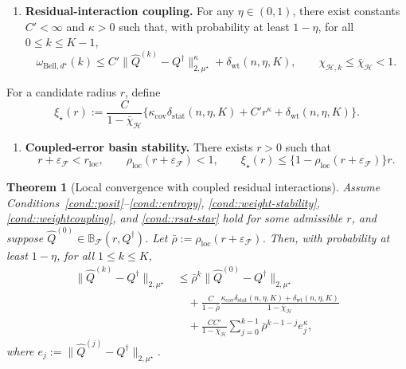 \documentclass{article}
\theoremstyle{plain}
\newtheorem{theorem}{Theorem}
\theoremstyle{definition}
\theoremstyle{remark}
\begin{document}
\begin{enumerate}[label=\textbf{C\arabic*)}, ref={C\arabic*}, leftmargin=1.5em, resume=cond]
\item \label{cond::weightcoupling}
\textbf{Residual-interaction coupling.}
For any \(\eta\in(0,1)\), there exist constants \(C'<\infty\) and
\(\kappa>0\) such that, with probability at least \(1-\eta\), for all
\(0\le k\le K-1\),
\[
\omega_{\mathrm{Bell},d^\star}(k)
\le
C'\|\widehat Q^{(k)}-Q^\dagger\|_{2,\mu^\star}^{\kappa}
+\delta_{\mathrm{wt}}(n,\eta,K),
\qquad
\chi_{\mathcal H,k}\le\bar\chi_{\mathcal H}<1.
\]
\end{enumerate}

For a candidate radius \(r\), define
\[
\xi_\star(r)
:=
\frac{C}{1-\bar\chi_{\mathcal H}}
\{\kappa_{\mathrm{cov}}\delta_{\mathrm{stat}}(n,\eta,K)
+C'r^\kappa+\delta_{\mathrm{wt}}(n,\eta,K)\}.
\]

\begin{enumerate}[label=\textbf{C\arabic*)}, ref={C\arabic*}, leftmargin=1.5em, resume=cond]
\item \label{cond::rsat-star}
\textbf{Coupled-error basin stability.}
There exists \(r>0\) such that
\[
r+\varepsilon_{\mathcal F}<r_{\mathrm{loc}},
\qquad
\rho_{\mathrm{loc}}(r+\varepsilon_{\mathcal F})<1,
\qquad
\xi_\star(r)
\le
\{1-\rho_{\mathrm{loc}}(r+\varepsilon_{\mathcal F})\}r.
\]
\end{enumerate}

\begin{theorem}[Local convergence with coupled residual interactions]
\label{thm:local-convergence2}
Assume Conditions~\ref{cond::posit}--\ref{cond::entropy},
\ref{cond::weight-stability}, \ref{cond::weightcoupling}, and
\ref{cond::rsat-star} hold for some admissible \(r\), and suppose
\(\widehat Q^{(0)}\in\mathbb B_{\mathcal F}(r,Q^\dagger)\). Let
\(\bar\rho:=\rho_{\mathrm{loc}}(r+\varepsilon_{\mathcal F})\). Then, with
probability at least \(1-\eta\), for all \(1\le k\le K\),
\begin{align*}
\|\widehat Q^{(k)}-Q^\dagger\|_{2,\mu^\star}
&\le
\bar\rho^k\|\widehat Q^{(0)}-Q^\dagger\|_{2,\mu^\star}
\\
&\quad+
\frac{C}{1-\bar\rho}
\frac{\kappa_{\mathrm{cov}}\delta_{\mathrm{stat}}(n,\eta,K)
+\delta_{\mathrm{wt}}(n,\eta,K)}{1-\bar\chi_{\mathcal H}}
\\
&\quad+
\frac{C C'}{1-\bar\chi_{\mathcal H}}
\sum_{j=0}^{k-1}\bar\rho^{k-1-j}e_j^\kappa,
\end{align*}
where \(e_j:=\|\widehat Q^{(j)}-Q^\dagger\|_{2,\mu^\star}\).
\end{theorem}
\end{document}
